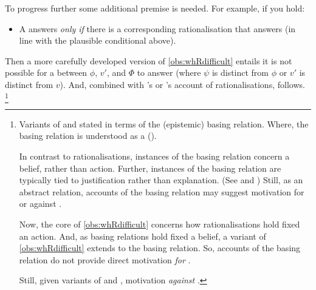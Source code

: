 \begin{note}
  To progress further some additional premise is needed.
  For example, if you hold:
  \begin{itemize}
  \item
    A \ros{} answers \qWhy{} \emph{only if} there is a corresponding rationalisation that answers \qWhyR{} (in line with the plausible conditional above).
  \end{itemize}
  Then a more carefully developed version of \autoref{obs:whRdifficult} entails it is not possible for a \ros{} between \(\phi\), \(v'\), and \(\Phi\) to answer \qWhy{} (where \(\psi\) is distinct from \(\phi\) or \(v'\) is distinct from \(v\)).
  And, combined with \citeauthor{Davidson:1963aa}'s or \citeauthor{Hieronymi:2011aa}'s account of rationalisations, \issueInclusion{} follows.%
  \footnote{
    Variants of \qWhy{} and \qHow{} stated in terms of the (epistemic) basing relation.
    Where, the basing relation is understood as a  (\cite{Korcz:2021ue}).

    In contrast to rationalisations, instances of the basing relation concern a belief, rather than action.
    Further, instances of the basing relation are typically tied to justification rather than explanation.
    (See \cite{Korcz:2021ue} and \cite[35]{Pollock:1999tm})
    Still, as an abstract relation, accounts of the basing relation may suggest motivation for or against \issueInclusion{}.

    Now, the core of \autoref{obs:whRdifficult} concerns how rationalisations hold fixed an action.
    And, as basing relations hold fixed a belief, a variant of \autoref{obs:whRdifficult} extends to the basing relation.
    So, accounts of the basing relation do not provide direct motivation \emph{for} \issueInclusion{}.

    Still, given variants of \qWhy{} and \qHow{}, motivation \emph{against} \issueInclusion{}.

}
\end{note}
